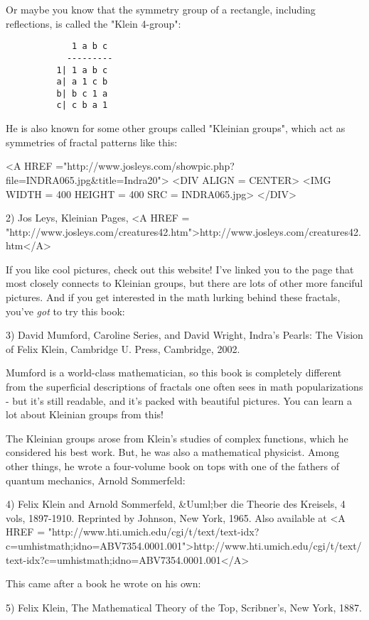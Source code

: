 Or maybe you know that the symmetry group of a rectangle, including 
reflections, is called the "Klein 4-group":

\begin{verbatim}
             1 a b c
            ---------
          1| 1 a b c
          a| a 1 c b
          b| b c 1 a
          c| c b a 1
\end{verbatim}
    
He is also known for some other groups called "Kleinian groups", which
act as symmetries of fractal patterns like this:

<A HREF ="http://www.josleys.com/showpic.php?file=INDRA065.jpg&title=Indra20">
<DIV ALIGN = CENTER>
<IMG WIDTH = 400 HEIGHT = 400 SRC = INDRA065.jpg>
</DIV>

2) Jos Leys, Kleinian Pages, <A HREF = "http://www.josleys.com/creatures42.htm">http://www.josleys.com/creatures42.htm</A>

If you like cool pictures, check out this website!  I've linked you to 
the page that most closely connects to Kleinian groups, but there are 
lots of other more fanciful pictures.   And if you get interested in 
the math lurking behind these fractals, you've \emph{got} to try this book:

3) David Mumford, Caroline Series, and David Wright, Indra's Pearls: 
The Vision of Felix Klein, Cambridge U. Press, Cambridge, 2002.

Mumford is a world-class mathematician, so this book is completely
different from the superficial descriptions of fractals one often sees
in math popularizations - but it's still readable, and it's packed with 
beautiful pictures.  You can learn a lot about Kleinian groups from this!

The Kleinian groups arose from Klein's studies of complex functions,
which he considered his best work.  But, he was also a mathematical 
physicist.  Among other things, he wrote a four-volume book on tops 
with one of the fathers of quantum mechanics, Arnold Sommerfeld:

4) Felix Klein and Arnold Sommerfeld, &Uuml;ber die Theorie des Kreisels,
4 vols, 1897-1910.  Reprinted by Johnson, New York, 1965.  Also available
at <A HREF = "http://www.hti.umich.edu/cgi/t/text/text-idx?c=umhistmath;idno=ABV7354.0001.001">http://www.hti.umich.edu/cgi/t/text/text-idx?c=umhistmath;idno=ABV7354.0001.001</A>

This came after a book he wrote on his own:

5) Felix Klein, The Mathematical Theory of the Top, Scribner's, 
New York, 1887.

